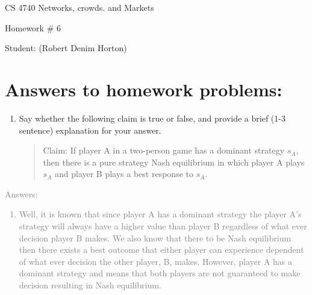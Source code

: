 \documentclass[11pt]{article}
\begin{document}
 

\rhead{\today}

\begin{center}\begin{Large}
CS 4740 Networks, crowds. and Markets 

Homework \# 6

Student: (Robert Denim Horton)
\end{Large}
\end{center}

\section*{Answers to homework problems:}

\begin{enumerate}
	\item Say whether the following claim is true or false, and provide a brief (1-3 sentence) explanation for your answer. \\
	\begin{quote}
		 Claim: If player A in a two-person game has a dominant strategy $s_A$, then there is a pure strategy Nash equilibrium in which player A plays $s_A$ and player B plays a best response to $s_A$. 
	\end{quote}
\end{enumerate}
\textcolor{gray}{
Answers:
\begin{enumerate}
	\item Well, it is known that since player A has a dominant strategy the player A's strategy will always have a higher value than player B regardless of what ever decision player B makes.  We also know that there to be Nash equilibrium then there exists a best outcome that either player can experience dependent of what ever decision the other player, B,  makes. However,  player A has a dominant strategy and means that both players are not guaranteed to make decision resulting in Nash equilibrium.   
\end{enumerate}
}
\end{document}
